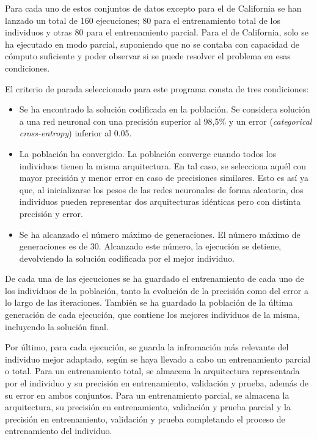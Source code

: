 \documentclass[spanish,a4paper,12pt,twoside]{report}
\begin{document}
  Para cada uno de estos conjuntos de datos excepto para el de California se han lanzado un total de 160 ejecuciones; 80 para el entrenamiento total de los individuos y otras 80 para el entrenamiento parcial. Para el de California, solo se ha ejecutado en modo parcial, suponiendo que no se contaba con capacidad de cómputo suficiente y poder observar si se puede resolver el problema en esas condiciones. \par
  El criterio de parada seleccionado para este programa consta de tres condiciones: \par
  \begin{itemize}
    \item Se ha encontrado la solución codificada en la población. Se considera solución a una red neuronal con una precisión superior al 98,5\% y un error (\emph{categorical cross-entropy}) inferior al 0.05.
    \item La población ha convergido. La población converge cuando todos los individuos tienen la misma arquitectura. En tal caso, se selecciona aquél con mayor precisión y menor error en caso de precisiones similares. Esto es así ya que, al inicializarse los pesos de las redes neuronales de forma aleatoria, dos individuos pueden representar dos arquitecturas idénticas pero con distinta precisión y error.
    \item Se ha alcanzado el número máximo de generaciones. El número máximo de generaciones es de 30. Alcanzado este número, la ejecución se detiene, devolviendo la solución codificada por el mejor individuo.
  \end{itemize}
  De cada una de las ejecuciones se ha guardado el entrenamiento de cada uno de los individuos de la población, tanto la evolución de la precisión como del error a lo largo de las iteraciones. También se ha guardado la población de la última generación de cada ejecución, que contiene los mejores individuos de la misma, incluyendo la solución final. \par
  Por último, para cada ejecución, se guarda la infromación más relevante del individuo mejor adaptado, según se haya llevado a cabo un entrenamiento parcial o total. Para un entrenamiento total, se almacena la arquitectura representada por el individuo y su precisión en entrenamiento, validación y prueba, además de su error en ambos conjuntos. Para un entrenamiento parcial, se almacena la arquitectura, su precisión en entrenamiento, validación y prueba parcial y la precisión en entrenamiento, validación y prueba completando el proceso de entrenamiento del individuo. \par
\end{document}
